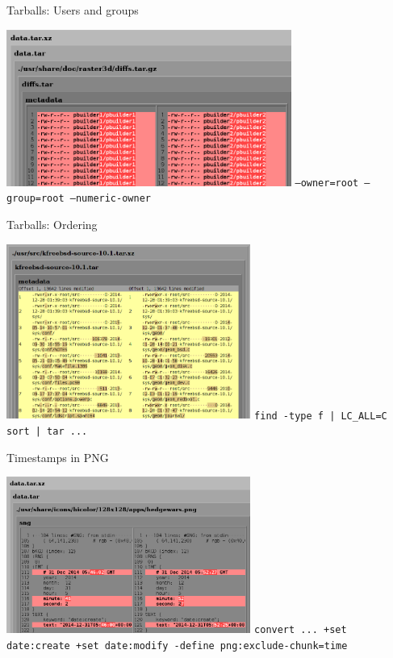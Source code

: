 \documentclass[14pt]{beamer}
\begin{document}
\begin{frame}{Tarballs: Users and groups}
 \begin{center}
  \includegraphics[width=0.7\textwidth]{images/examples/user_and_group_in_tarball.png}
  \vfill
  \texttt{--owner=root --group=root --numeric-owner}
 \end{center}
\end{frame}

\begin{frame}{Tarballs: Ordering}
 \begin{center}
  \includegraphics[width=0.6\textwidth]{images/examples/random_order_in_tarball.png}
  \vfill
  \texttt{find -type f | LC\_ALL=C sort | tar ...}
 \end{center}
\end{frame}

\begin{frame}{Timestamps in PNG}
 \begin{center}
  \includegraphics[width=0.6\textwidth]{images/examples/timestamps_in_png.png}
  \vfill
  \texttt{convert ... +set date:create +set date:modify -define png:exclude-chunk=time}
 \end{center}
\end{frame}
\end{document}
